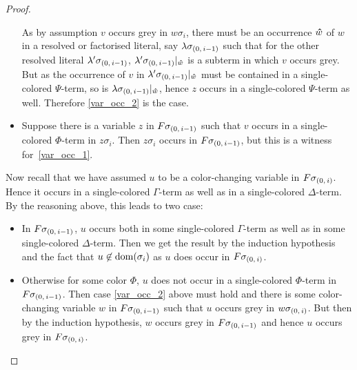 \documentclass[,%
	draft=false,%
	numbers=noendperiod
	12pt,
	a4paper,
	oneside,%
	openany,
]{memoir}
\begin{document}
\begin{proof}
\begin{itemize}
		As by assumption $v$ occurs grey in $w\sigma_i$, there must be an occurrence $\bm\hat w$ of $w$ in a resolved or factorised literal, say $\lambda\sigma_{(0,\,i-1)}$ such that for the other resolved literal $\lambda'\sigma_{(0,\,i-1)}$, $\lambda'\sigma_{(0,\,i-1)}|_{\bm\hat w}$ is a subterm in which $v$ occurs grey.
		But as the occurrence of $v$ in $\lambda'\sigma_{(0,\,i-1)}|_{\bm\hat w}$ must be contained in a single-colored $\Psi$-term, so is $\lambda\sigma_{(0,\,i-1)}|_{\bm\hat w}$, hence $z$ occurs in a single-colored $\Psi$-term as well.
		Therefore \ref{var_occ_2} is the case.

	\item
		Suppose there is a variable $z$ in $F\sigma_{(0,\,i-1)}$ such that $v$ occurs in a single-colored $\Phi$-term in $z\sigma_i$.
		Then $z\sigma_i$ occurs in $F\sigma_{(0,\,i-1)}$, but this is a witness for~\ref{var_occ_1}.
\end{itemize}

Now recall that we have assumed $u$ to be a color-changing variable in $F\sigma_{(0,\,i)}$.
Hence it occurs in a single-colored $\Gamma$-term as well as in a single-colored $\Delta$-term.
By the reasoning above, this leads to two case:
\begin{itemize}
	\item In $F\sigma_{(0,\,i-1)}$, $u$ occurs both in some single-colored $\Gamma$-term as well as in some single-colored $\Delta$-term.
		Then we get the result by the induction hypothesis and the fact that $u\not\in\operatorname{dom}(\sigma_i)$ as $u$ does occur in $F\sigma_{(0,\,i)}$.
	\item Otherwise for some color $\Phi$, $u$ does not occur in a single-colored $\Phi$-term in $F\sigma_{(0,\,i-1)}$.
		Then case \ref{var_occ_2} above must hold and there is some color-changing variable $w$ in $F\sigma_{(0,\,i-1)}$ such that $u$ occurs grey in $w\sigma_{(0,\,i)}$.
		But then by the induction hypothesis, $w$ occurs grey in $F\sigma_{(0,\,i-1)}$ and hence $u$ occurs grey in $F\sigma_{(0,\,i)}$.
		\qedhere
\end{itemize}
\end{proof}

~
\end{document}
